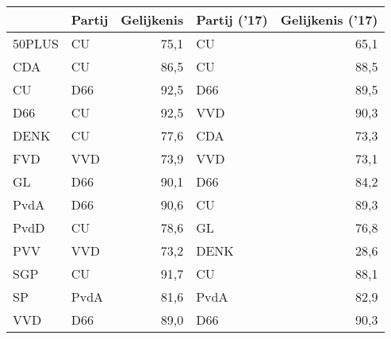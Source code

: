 \begin{tabular}{llrlr}
\toprule
{} & Partij &  Gelijkenis & Partij ('17) &  Gelijkenis ('17) \\
\midrule
50PLUS &     CU &        75,1 &           CU &              65,1 \\
CDA    &     CU &        86,5 &           CU &              88,5 \\
CU     &    D66 &        92,5 &          D66 &              89,5 \\
D66    &     CU &        92,5 &          VVD &              90,3 \\
DENK   &     CU &        77,6 &          CDA &              73,3 \\
FVD    &    VVD &        73,9 &          VVD &              73,1 \\
GL     &    D66 &        90,1 &          D66 &              84,2 \\
PvdA   &    D66 &        90,6 &           CU &              89,3 \\
PvdD   &     CU &        78,6 &           GL &              76,8 \\
PVV    &    VVD &        73,2 &         DENK &              28,6 \\
SGP    &     CU &        91,7 &           CU &              88,1 \\
SP     &   PvdA &        81,6 &         PvdA &              82,9 \\
VVD    &    D66 &        89,0 &          D66 &              90,3 \\
\bottomrule
\end{tabular}
